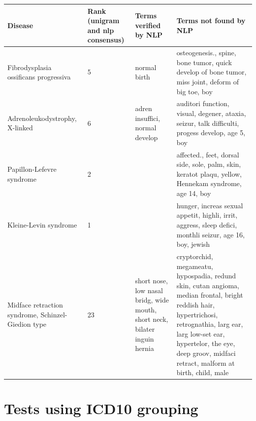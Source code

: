 \documentclass[10pt,letterpaper,final]{article}
\begin{document}
\begin{center}
\begin{small}
	\begin{longtable}{|p{3.5cm}|p{1.5cm}|p{3cm}|p{3cm}|}
	\hline
	\textbf{Disease}  & \textbf{Rank (unigram and nlp consensus)} & \textbf{Terms verified by NLP}  & \textbf{Terms not found by NLP} \\
	\hline\hline
Fibrodysplasia ossificans progressiva & 5 & normal birth & osteogenesis., spine, bone tumor, quick develop of bone tumor, miss joint, deform of big toe, boy \\ \hline
Adrenoleukodystrophy, X-linked & 6 & adren insuffici, normal develop & auditori function, visual, degener, ataxia, seizur, talk difficulti, progess develop, age 5, boy \\ \hline
Papillon-Lefevre syndrome & 2 &  & affected., feet, dorsal side, sole, palm, skin, keratot plaqu, yellow, Hennekam syndrome, age 14, boy \\ \hline
Kleine-Levin syndrome & 1 &  & hunger, increas sexual appetit, highli, irrit, aggress, sleep defici, monthli seizur, age 16, boy, jewish \\ \hline
Midface retraction syndrome, Schinzel-Giedion type & 23 & short nose, low nasal bridg, wide mouth, short neck, bilater inguin hernia & cryptorchid, megameatu, hypospadia, redund skin, cutan angioma, median frontal, bright reddish hair, hypertrichosi, retrognathia, larg ear, larg low-set ear, hypertelor, the eye, deep groov, midfaci retract, malform at birth, child, male \\ \hline
	\end{longtable}
\end{small}
\end{center}




\newpage
\section{Tests using ICD10 grouping}
\end{document}
